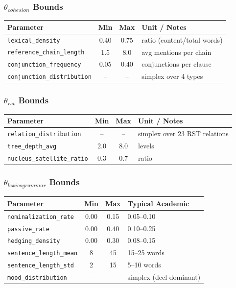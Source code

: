 \subsubsection{$\theta_{cohesion}$ Bounds}

\begin{center}
\begin{tabular}{lccl}
\toprule
Parameter & Min & Max & Unit / Notes \\
\midrule
\texttt{lexical\_density} & 0.40 & 0.75 & ratio (content/total words) \\
\texttt{reference\_chain\_length} & 1.5 & 8.0 & avg mentions per chain \\
\texttt{conjunction\_frequency} & 0.05 & 0.40 & conjunctions per clause \\
\texttt{conjunction\_distribution} & -- & -- & simplex over 4 types \\
\bottomrule
\end{tabular}
\end{center}

\subsubsection{$\theta_{rst}$ Bounds}

\begin{center}
\begin{tabular}{lccl}
\toprule
Parameter & Min & Max & Unit / Notes \\
\midrule
\texttt{relation\_distribution} & -- & -- & simplex over 23 RST relations \\
\texttt{tree\_depth\_avg} & 2.0 & 8.0 & levels \\
\texttt{nucleus\_satellite\_ratio} & 0.3 & 0.7 & ratio \\
\bottomrule
\end{tabular}
\end{center}

\subsubsection{$\theta_{lexicogrammar}$ Bounds}

\begin{center}
\begin{tabular}{lccl}
\toprule
Parameter & Min & Max & Typical Academic \\
\midrule
\texttt{nominalization\_rate} & 0.00 & 0.15 & 0.05--0.10 \\
\texttt{passive\_rate} & 0.00 & 0.40 & 0.10--0.25 \\
\texttt{hedging\_density} & 0.00 & 0.30 & 0.08--0.15 \\
\texttt{sentence\_length\_mean} & 8 & 45 & 15--25 words \\
\texttt{sentence\_length\_std} & 2 & 15 & 5--10 words \\
\texttt{mood\_distribution} & -- & -- & simplex (decl dominant) \\
\bottomrule
\end{tabular}
\end{center}

